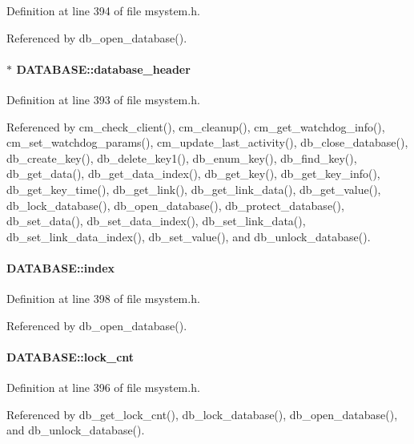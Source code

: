 Definition at line 394 of file msystem.h.

Referenced by db\_\-open\_\-database().
\paragraph[{database\_\-header}]{$\ast$ {\bf DATABASE::database\_\-header}}\hfill\label{structDATABASE_a913168e1470de7da8439d5c688ab5b46}


Definition at line 393 of file msystem.h.

Referenced by cm\_\-check\_\-client(), cm\_\-cleanup(), cm\_\-get\_\-watchdog\_\-info(), cm\_\-set\_\-watchdog\_\-params(), cm\_\-update\_\-last\_\-activity(), db\_\-close\_\-database(), db\_\-create\_\-key(), db\_\-delete\_\-key1(), db\_\-enum\_\-key(), db\_\-find\_\-key(), db\_\-get\_\-data(), db\_\-get\_\-data\_\-index(), db\_\-get\_\-key(), db\_\-get\_\-key\_\-info(), db\_\-get\_\-key\_\-time(), db\_\-get\_\-link(), db\_\-get\_\-link\_\-data(), db\_\-get\_\-value(), db\_\-lock\_\-database(), db\_\-open\_\-database(), db\_\-protect\_\-database(), db\_\-set\_\-data(), db\_\-set\_\-data\_\-index(), db\_\-set\_\-link\_\-data(), db\_\-set\_\-link\_\-data\_\-index(), db\_\-set\_\-value(), and db\_\-unlock\_\-database().
\paragraph[{index}]{ {\bf DATABASE::index}}\hfill\label{structDATABASE_a7054193c48f9dbb796dd3d777b674f79}


Definition at line 398 of file msystem.h.

Referenced by db\_\-open\_\-database().
\paragraph[{lock\_\-cnt}]{ {\bf DATABASE::lock\_\-cnt}}\hfill\label{structDATABASE_a4e0442ceb25e465d76a35a3e730ee2f0}


Definition at line 396 of file msystem.h.

Referenced by db\_\-get\_\-lock\_\-cnt(), db\_\-lock\_\-database(), db\_\-open\_\-database(), and db\_\-unlock\_\-database().
